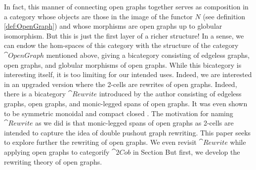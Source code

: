 In fact, this manner of 
connecting open graphs together
serves as composition 
in a category whose objects are 
those in the image of the functor $N$
(see definition \ref{def:OpenGraph})
and whose morphisms are open graphs
up to globular isomorphism.  
But this is just the first layer 
of a richer structure!
In a sense, we can endow
the hom-spaces of this category
with the structure of the category
$\cat{OpenGraph}$ mentioned above,
giving a bicategory consisting of
edgeless graphs, 
open graphs, and
globular morphisms of open graphs.
While this bicategory is interesting
itself, it is too limiting 
for our intended uses.  
Indeed, we are interested in
an upgraded version
where the 2-cells are
rewrites of open graphs.
Indeed, there is a bicategory 
$\cat{Rewrite}$ introduced by the author
\citep{Cicala_SpansCospans}
consisting of edgeless graphs,
open graphs, and 
monic-legged spans of open graphs. 
It was even shown to be 
symmetric monoidal and compact closed
\citep{CicalaCourser_BicatSpansCospan}.
The motivation for naming $\cat{Rewrite}$
as we did is that 
monic-legged spans of open graphs
as 2-cells are intended to
capture the idea of 
double pushout graph rewriting.  
This paper seeks to explore further
the rewriting of open graphs.  
We even revisit $\cat{Rewrite}$
while applying open graphs
to categorify $\cat{2Cob}$
in Section 
But first, we develop the
rewriting theory of open graphs.







